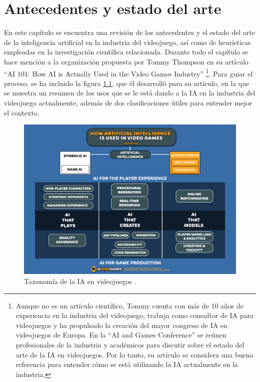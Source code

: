 \chapter{Antecedentes y estado del arte} \label{chap:antecedentes}

En este capítulo se encuentra una revisión de los antecedentes y el estado del arte de la inteligencia artificial en la industria del videojuego, así como de heurísticas empleadas en la investigación científica relacionada. Durante todo el capítulo se hace mención a la organización propuesta por Tommy Thompson en su artículo ``AI 101: How AI is Actually Used in the Video Games Industry'' \cite{thompson_how_2025}\footnote{Aunque no es un artículo científico, Tommy cuenta con más de 10 años de experiencia en la industria del videojuego, trabaja como consultor de IA para videojuegos y ha propulsado la creación del mayor congreso de IA en videojuegos de Europa. En la ``AI and Games Conference'' se reúnen profesionales de la industria y académicos para discutir sobre el estado del arte de la IA en videojuegos. Por lo tanto, su artículo se considera una buena referencia para entender cómo se está utilizando la IA actualmente en la industria.}. Para guiar el proceso, se ha incluido la figura \ref{fig:ia_taxonomia}, que él desarrolló para su artículo, en la que se muestra un resumen de los usos que se le está dando a la IA en la industria del videojuego actualmente, además de dos clasificaciones útiles para entender mejor el contexto.

\begin{figure}
	\centering
	\includegraphics[width=1.0\textwidth]{img/AIforGames-Taxonomy.png}
	\caption{Taxonomía de la IA en videojuegos \cite{thompson_how_2025}.}
	\label{fig:ia_taxonomia}
\end{figure}

